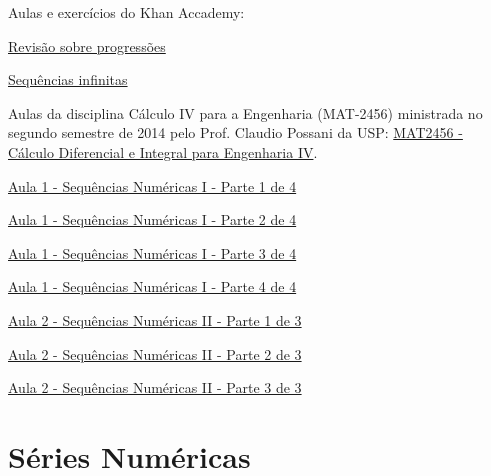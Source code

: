 Aulas e exercícios do Khan Accademy:
\begin{listlinks}
  \item \href{https://pt.khanacademy.org/math/calculus-home/series-calc/sequences-calc/v/explicit-and-recursive-definitions-of-sequences}{Revisão sobre progressões}
  \item \href{https://pt.khanacademy.org/math/calculus-home/series-calc/seq-conv-diverg-calc/v/convergent-and-divergent-sequences       }{Sequências infinitas     }
\end{listlinks}

Aulas da disciplina Cálculo IV para a Engenharia (MAT-2456)
ministrada no segundo semestre de 2014 pelo Prof. Claudio Possani da USP:
\href{https://www.youtube.com/playlist?list=PLxI8Can9yAHeOiMYCBlkyCALloROQ58OY}%
     {MAT2456 - Cálculo Diferencial e Integral para Engenharia IV}.
\begin{listlinks}
  \item \href{https://www.youtube.com/watch?v=BrufXJ2AhNo&list=PLxI8Can9yAHeOiMYCBlkyCALloROQ58OY&index=2&t=0s}{Aula 1 - Sequências Numéricas I  - Parte 1 de 4}
  \item \href{https://www.youtube.com/watch?v=-WXsYcWLr30&list=PLxI8Can9yAHeOiMYCBlkyCALloROQ58OY&index=3&t=0s}{Aula 1 - Sequências Numéricas I  - Parte 2 de 4}
  \item \href{https://www.youtube.com/watch?v=j8bd446q2wk&list=PLxI8Can9yAHeOiMYCBlkyCALloROQ58OY&index=4&t=0s}{Aula 1 - Sequências Numéricas I  - Parte 3 de 4}
  \item \href{https://www.youtube.com/watch?v=767sM0V6Ss4&list=PLxI8Can9yAHeOiMYCBlkyCALloROQ58OY&index=5&t=0s}{Aula 1 - Sequências Numéricas I  - Parte 4 de 4}
  \item \href{https://www.youtube.com/watch?v=lUfv3bspiGw&list=PLxI8Can9yAHeOiMYCBlkyCALloROQ58OY&index=6&t=0s}{Aula 2 - Sequências Numéricas II - Parte 1 de 3}
  \item \href{https://www.youtube.com/watch?v=LxjSbzWipak&list=PLxI8Can9yAHeOiMYCBlkyCALloROQ58OY&index=7&t=0s}{Aula 2 - Sequências Numéricas II - Parte 2 de 3}
  \item \href{https://www.youtube.com/watch?v=hSuUyOXvfvk&list=PLxI8Can9yAHeOiMYCBlkyCALloROQ58OY&index=8&t=0s}{Aula 2 - Sequências Numéricas II - Parte 3 de 3}
\end{listlinks}

\section{Séries Numéricas}

